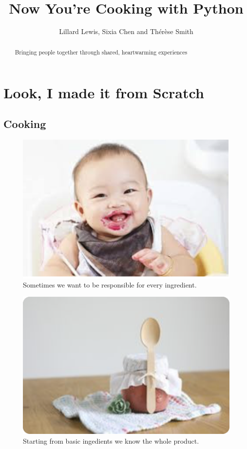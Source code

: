 \documentclass[]{report}
\title{Now You're Cooking with Python}
\author{Lillard Lewis, Sixia Chen and Th\'er\`ese Smith}
\begin{document}
\maketitle

\begin{abstract}
	Bringing people together through shared, heartwarming experiences
\end{abstract}

\chapter{Look, I made it from Scratch}
\section{Cooking}

\begin{figure}
	\centering
	\includegraphics[width=0.7\linewidth]{babyFood}
	\caption{Sometimes we want to be responsible for every ingredient.}
	\label{fig:babyfood}
\end{figure}

\begin{figure}
	\centering
	\includegraphics[width=0.7\linewidth]{withSpoon}
	\caption{Starting from basic ingedients we know the whole product.}
	\label{fig:withspoon}
\end{figure}
\end{document}
